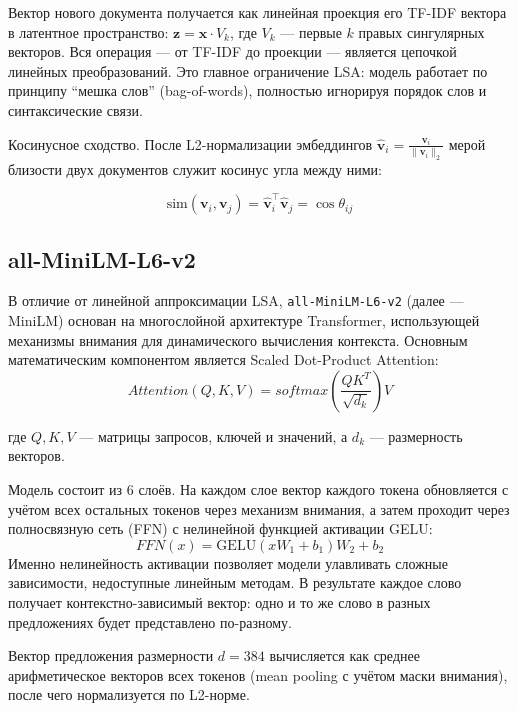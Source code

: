 Вектор нового документа получается как линейная проекция его TF-IDF
вектора в латентное пространство: \( \mathbf{z} = \mathbf{x} \cdot V_k \),
где \( V_k \) --- первые \( k \) правых сингулярных векторов.
Вся операция --- от TF-IDF до проекции --- является цепочкой линейных
преобразований. Это главное ограничение LSA: модель работает по
принципу \enquote{мешка слов} (bag-of-words), полностью игнорируя
порядок слов и синтаксические связи.

Косинусное сходство. После L2-нормализации эмбеддингов
\(\hat{\mathbf{v}}_i = \frac{\mathbf{v}_i}{\|\mathbf{v}_i\|_2}\) мерой
близости двух документов служит косинус угла между ними:

\begin{displaymath}
  \text{sim}(\mathbf{v}_i, \mathbf{v}_j) = \hat{\mathbf{v}}_i^\top
  \hat{\mathbf{v}}_j = \cos\theta_{ij}
\end{displaymath}

\subsection{all-MiniLM-L6-v2}

В отличие от линейной аппроксимации LSA, \texttt{all-MiniLM-L6-v2}
(далее --- MiniLM) основан на многослойной
архитектуре Transformer, использующей механизмы внимания для динамического
вычисления контекста. Основным математическим компонентом является Scaled
Dot-Product Attention:
\[
  Attention(Q, K, V) = softmax(\frac{QK^T}{\sqrt{d_k}})V
\]

где \( Q, K, V \) --- матрицы запросов, ключей и значений, а \( d_k \) ---
размерность векторов.

Модель состоит из 6 слоёв. На каждом слое вектор каждого токена
обновляется с учётом всех остальных токенов через механизм внимания,
а затем проходит через полносвязную сеть (FFN) с нелинейной функцией
активации GELU:
\[
  FFN(x) = \mathrm{GELU}(xW_1 + b_1)W_2 + b_2
\]
Именно нелинейность активации позволяет модели улавливать сложные
зависимости, недоступные линейным методам. В результате каждое слово
получает контекстно-зависимый вектор: одно и то же слово в разных
предложениях будет представлено по-разному.

Вектор предложения размерности $d = 384$ вычисляется как среднее
арифметическое векторов всех токенов (mean pooling с учётом маски
внимания), после чего нормализуется по L2-норме.

